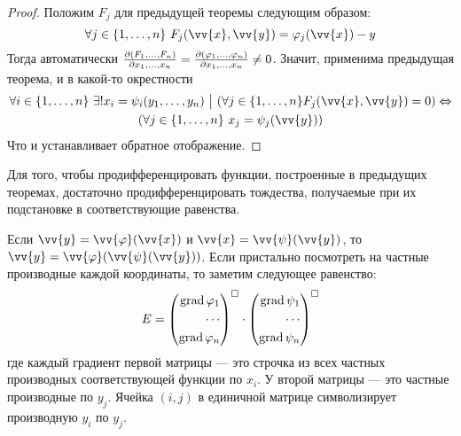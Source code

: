 \begin{proof}
	Положим $F_j$ для предыдущей теоремы следующим образом:
	\[
		\forall j \in \range{n}\ F_j(\vv{x}, \vv{y}) = \phi_j(\vv{x}) - y
	\]
	Тогда автоматически $\frac{\partial (F_1, \ldots, F_n)}{\partial x_1, \ldots, x_n} = \frac{\partial (\varphi_1, \ldots, \varphi_n)}{\partial x_1, \ldots, x_n} \neq 0$. Значит, применима предыдущая теорема, и в какой-то окрестности
	\begin{multline*}
		\forall i \in \range{n}\ \exists! x_i = \psi_i(y_1, \ldots, y_n) \such (\forall j \in \range{n} F_j(\vv{x}, \vv{y}) = 0) \lra
		\\
		(\forall j \in \range{n}\ x_j = \psi_j(\vv{y}))
	\end{multline*}
	Что и устанавливает обратное отображение.
\end{proof}

\begin{note}
	Для того, чтобы продифференцировать функции, построенные в предыдущих теоремах, достаточно продифференцировать тождества, получаемые при их подстановке в соответствующие равенства.
	
	Если $\vv{y} = \vv{\phi}(\vv{x})$ и $\vv{x} = \vv{\psi}(\vv{y})$, то $\vv{y} = \vv{\phi}(\vv{\psi}(\vv{y}))$. Если пристально посмотреть на частные производные каждой координаты, то заметим следующее равенство:
	\[
		E = \left(\begin{aligned}\operatorname{grad} \varphi_1 \\ \cdots \\ \operatorname{grad} \varphi_n\end{aligned}\right)^{\square} \cdot \left(\begin{aligned}\operatorname{grad} \psi_1 \\ \cdots \\ \operatorname{grad} \psi_n\end{aligned}\right)^{\square}
	\]
	где каждый градиент первой матрицы --- это строчка из всех частных производных соответствующей функции по $x_i$. У второй матрицы --- это частные производные по $y_j$. Ячейка $(i, j)$ в единичной матрице символизирует производную $y_i$ по $y_j$.
\end{note}
